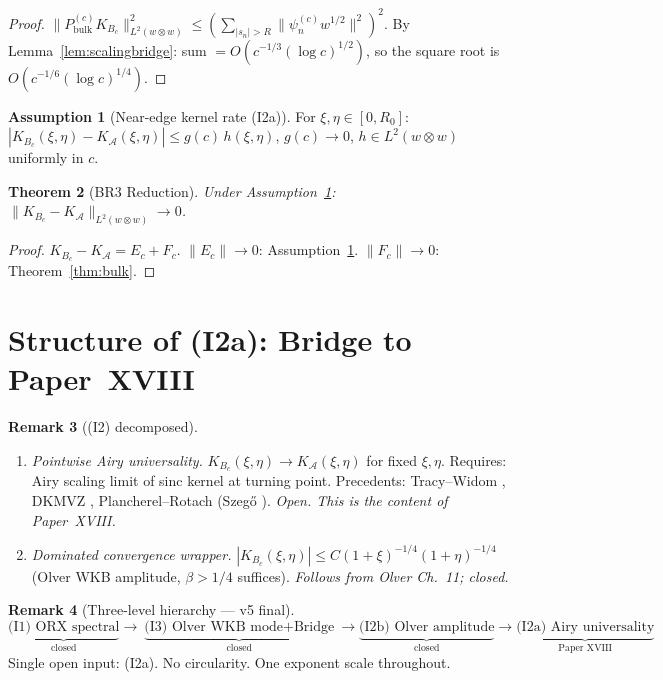 \documentclass[12pt,a4paper]{amsart}
\newtheorem{theorem}{Theorem}[section]
\theoremstyle{definition}
\newtheorem{assumption}[theorem]{Assumption}
\newtheorem{remark}[theorem]{Remark}
\newcommand{\cA}{\mathcal{A}}
\newcommand{\Sbulk}{P_{\mathrm{bulk}}^{(c)}}
\newcommand{\cK}{K_{B_c}}
\newcommand{\cKA}{K_{\cA}}
\begin{document}
\begin{proof}
$\|\Sbulk\cK\|_{L^2(w\otimes w)}^2
\leq(\sum_{|s_n|>R}\|\psi_n^{(c)}w^{1/2}\|^2)^2$.
By Lemma~\ref{lem:scalingbridge}: sum $= O(c^{-1/3}(\log c)^{1/2})$,
so the square root is $O(c^{-1/6}(\log c)^{1/4})$.
\end{proof}

\begin{assumption}[Near-edge kernel rate (I2a)]
\label{ass:kernelrate}
For $\xi,\eta\in[0,R_0]$:
$|\cK(\xi,\eta)-\cKA(\xi,\eta)|\leq g(c)\,h(\xi,\eta)$,
$g(c)\to 0$, $h\in L^2(w\otimes w)$ uniformly in $c$.
\end{assumption}

\begin{theorem}[BR3 Reduction]
\label{thm:br3}
Under Assumption~\ref{ass:kernelrate}:
$\|\cK-\cKA\|_{L^2(w\otimes w)}\to 0$.
\end{theorem}

\begin{proof}
$\cK-\cKA = E_c + F_c$.
$\|E_c\|\to 0$: Assumption~\ref{ass:kernelrate}.
$\|F_c\|\to 0$: Theorem~\ref{thm:bulk}.
\end{proof}

\section{Structure of (I2a): Bridge to Paper~XVIII}
\label{sec:I2}

\begin{remark}[(I2) decomposed]
\label{rem:I2}
\begin{enumerate}[nosep,label=(I2\alph*)]
  \item \emph{Pointwise Airy universality.}
    $\cK(\xi,\eta)\to\cKA(\xi,\eta)$ for fixed $\xi,\eta$.
    Requires: Airy scaling limit of sinc kernel at turning point.
    Precedents: Tracy--Widom \cite{TracyWidom1994},
    DKMVZ \cite{DKMVZ1999}, Plancherel--Rotach (Szeg\H{o} \cite{Szego1939}).
    \emph{Open. This is the content of Paper~XVIII.}
  \item \emph{Dominated convergence wrapper.}
    $|\cK(\xi,\eta)|\leq C(1+\xi)^{-1/4}(1+\eta)^{-1/4}$
    (Olver WKB amplitude, $\beta>1/4$ suffices).
    \emph{Follows from Olver Ch.~11; closed.}
\end{enumerate}
\end{remark}

\begin{remark}[Three-level hierarchy --- v5 final]
\label{rem:hierarchy}
\[
\underbrace{\text{(I1) ORX spectral}}_{\text{closed}}
\to
\underbrace{\text{(I3) Olver WKB mode}+\text{Bridge}}_{\text{closed}}
\to
\underbrace{\text{(I2b) Olver amplitude}}_{\text{closed}}
\to
\underbrace{\text{(I2a) Airy universality}}_{\text{Paper~XVIII}}
\]
Single open input: (I2a). No circularity. One exponent scale throughout.
\end{remark}
\end{document}
